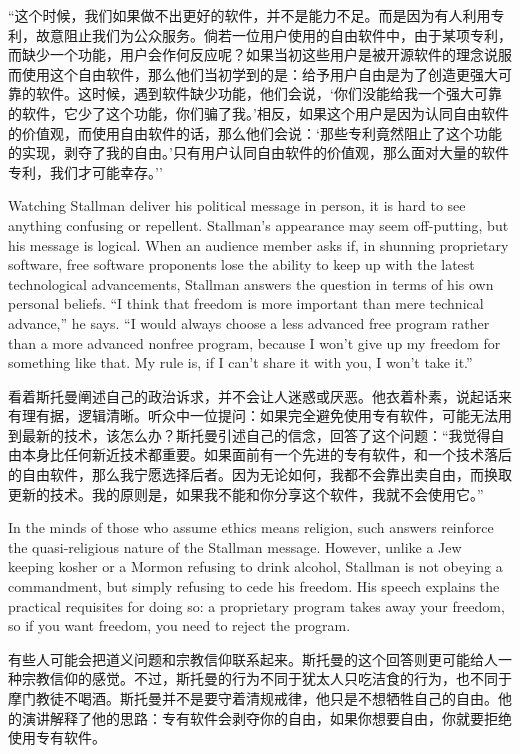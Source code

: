 \ifdefined\chs
``这个时候，我们如果做不出更好的软件，并不是能力不足。而是因为有人利用专利，故意阻止我们为公众服务。倘若一位用户使用的自由软件中，由于某项专利，而缺少一个功能，用户会作何反应呢？如果当初这些用户是被开源软件的理念说服而使用这个自由软件，那么他们当初学到的是：给予用户自由是为了创造更强大可靠的软件。这时候，遇到软件缺少功能，他们会说，`你们没能给我一个强大可靠的软件，它少了这个功能，你们骗了我。'相反，如果这个用户是因为认同自由软件的价值观，而使用自由软件的话，那么他们会说：`那些专利竟然阻止了这个功能的实现，剥夺了我的自由。'只有用户认同自由软件的价值观，那么面对大量的软件专利，我们才可能幸存。''
\fi
\fi

\ifdefined\eng
Watching Stallman deliver his political message in person, it is hard to see anything confusing or repellent. Stallman's appearance may seem off-putting, but his message is logical. When an audience member asks if, in shunning proprietary software, free software proponents lose the ability to keep up with the latest technological advancements, Stallman answers the question in terms of his own personal beliefs. ``I think that freedom is more important than mere technical advance,'' he says. ``I would always choose a less advanced free program rather than a more advanced nonfree program, because I won't give up my freedom for something like that. My rule is, if I can't share it with you, I won't take it.''
\fi

\ifdefined\chs
看着斯托曼阐述自己的政治诉求，并不会让人迷惑或厌恶。他衣着朴素，说起话来有理有据，逻辑清晰。听众中一位提问：如果完全避免使用专有软件，可能无法用到最新的技术，该怎么办？斯托曼引述自己的信念，回答了这个问题：``我觉得自由本身比任何新近技术都重要。如果面前有一个先进的专有软件，和一个技术落后的自由软件，那么我宁愿选择后者。因为无论如何，我都不会靠出卖自由，而换取更新的技术。我的原则是，如果我不能和你分享这个软件，我就不会使用它。''
\fi

\ifdefined\vtwo
\ifdefined\eng
In the minds of those who assume ethics means religion, such answers reinforce the quasi-religious nature of the Stallman message. However, unlike a Jew keeping kosher or a Mormon refusing to drink alcohol, Stallman is not obeying a commandment, but simply refusing to cede his freedom.  His speech explains the practical requisites for doing so: a proprietary program takes away your freedom, so if you want freedom, you need to reject the program.
\fi

\ifdefined\chs
有些人可能会把道义问题和宗教信仰联系起来。斯托曼的这个回答则更可能给人一种宗教信仰的感觉。不过，斯托曼的行为不同于犹太人只吃洁食的行为，也不同于摩门教徒不喝酒。斯托曼并不是要守着清规戒律，他只是不想牺牲自己的自由。他的演讲解释了他的思路：专有软件会剥夺你的自由，如果你想要自由，你就要拒绝使用专有软件。
\fi

